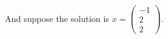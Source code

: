\documentclass[preview]{standalone}
\begin{document}
\begin{center}
And suppose the solution is $x = \begin{pmatrix}-1\\2\\2\end{pmatrix}.$
\end{center}
\end{document}
